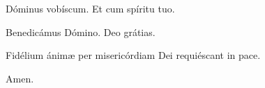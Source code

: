 \vv Dóminus vobíscum. \rr Et cum spíritu tuo.


\vv Benedicámus Dómino. \rr Deo grátias.

\vv Fidélium ánimæ per misericórdiam Dei requiéscant in pace.

\rr Amen.


